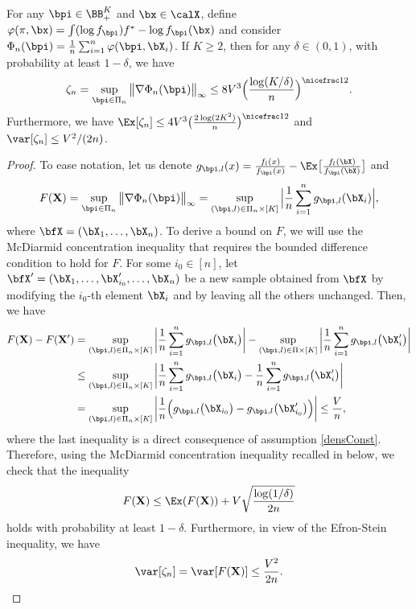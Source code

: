 \begin{prop}
\label{boundEmpProcess}
For any $\bpi\in\BB^K_+$ and $\bx\in\calX$, define $\varphi(\pi,\bx) = \int (\log f_{\bpi})f^* -\log f_{\bpi}(\bx)$ and consider
$\Phi_n(\bpi)=\frac1n\sum_{i=1}^n \varphi(\bpi,\bX_i)$. If $K\ge 2$, then for any $\delta \in (0,1)$, with probability at
least $1-\delta$, we have
\begin{equation}
  \zeta_n=\sup_{\bpi\in\Pi_n}\big\| \nabla \Phi_n(\bpi)\big\|_\infty \leq 8V^3\Big(\frac{\log(K/\delta)}{n}\Big)^{\nicefrac12}.
\end{equation}
Furthermore, we have $\Ex[\zeta_n]\le 4V^3\big(\frac{2\log(2K^2)}{n}\big)^{\nicefrac12}$ and $\var[\zeta_n]\le V^2/(2n)$.
\end{prop}
\begin{proof}
To ease notation, let us denote $g_{\bpi,l}(x) = \frac{f_l(x)}{f_{\bpi}(x)}-
\Ex\big[ \frac{f_l(\bX)}{f_{\bpi}(\bX)}\big]$ and
\begin{equation}
  F(\mathbf X) = \sup_{\bpi\in\Pi_n}\big\| \nabla \Phi_n(\bpi)\big\|_\infty
  =\sup_{(\bpi,l)\in\Pi_n\times[K]}\Big|  \frac{1}{n}\sum_{i=1}^n g_{\bpi,l}(\bX_i) \Big|,
\end{equation}
where $\bfX=(\bX_1,\dots,\bX_n)$.  To derive a bound on $F$, we will use the McDiarmid concentration
inequality that requires the bounded difference condition to hold for $F$. For some $i_0\in[n]$, let
$\bfX'=(\bX_1,\dots,\bX'_{i_0},\dots,\bX_n)$  be a new sample obtained from $\bfX$ by modifying the
$i_0$-th element $\bX_i$ and by leaving all the others unchanged. Then, we have
\begin{align}
F(\mathbf X)-F(\mathbf X')
        &= \sup_{(\bpi,l)\in\Pi_n\times[K]} \bigg|  \frac{1}{n}\sum_{i=1}^n g_{\bpi,l}\big(\bX_i\big) \bigg|-\sup_{(\bpi,l)\in\Pi\times[K]} \bigg|
            \frac{1}{n}\sum_{i=1}^n g_{\bpi,l}\big(\bX'_i\big) \bigg|\\
        &\leq \sup_{(\bpi,l)\in\Pi_n\times[K]}  \bigg|\frac{1}{n}\sum_{i=1}^n g_{\bpi,l}\big(\bX_i\big) - \frac{1}{n}\sum_{i=1}^n g_{\bpi,l}\big(\bX'_i\big)  \bigg|\\
        &=\sup_{(\bpi,l)\in\Pi_n\times[K]} \bigg| \frac{1}{n}\Big(g_{\bpi,l}\big(\bX_{i_0}\big) - g_{\bpi,l}\big(\bX'_{i_0}\big)\Big) \bigg|
        \leq \frac{V}{n},
\end{align}
where the last inequality is a direct consequence of assumption \eqref{densConst}. Therefore, using the McDiarmid concentration inequality recalled
in  below, we check that the inequality
\begin{equation}
\label{concIneqZ}
  F(\mathbf X) \leq \Ex(F(\mathbf X))+V\sqrt{\frac{\log(1/\delta)}{2n}}
\end{equation}
holds with probability at least $1-\delta$. Furthermore, in view of the Efron-Stein
inequality, we have
\begin{equation}
\label{EfrStein}
  \var[\zeta_n] = \var[F(\mathbf X)] \leq \frac{V^2}{2n}.
\end{equation}


\end{proof}
